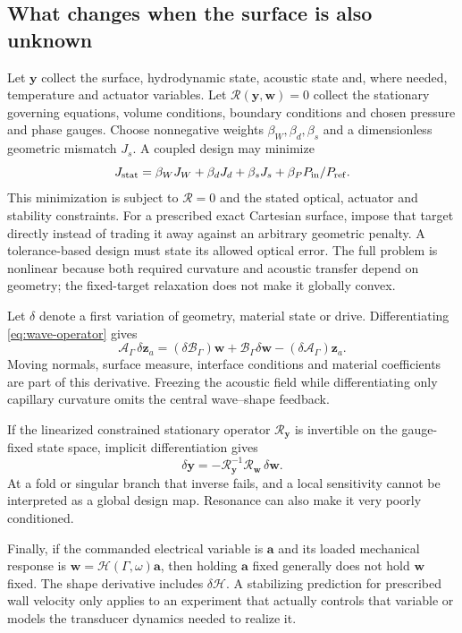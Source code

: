 \subsection{What changes when the surface is also unknown}
Let $\bm y$ collect the surface, hydrodynamic state, acoustic state and, where
needed, temperature and actuator variables. Let
$\mathcal R(\bm y,\bm w)=0$ collect the stationary governing equations,
volume conditions, boundary conditions and chosen pressure and phase gauges.
Choose nonnegative weights $\beta_W,\beta_d,\beta_s$ and a dimensionless
geometric mismatch $J_s$. A coupled design may minimize
\begin{equation}
 J_{\rm stat}=\beta_WJ_W+\beta_dJ_d+\beta_sJ_s
       +\beta_P P_{\rm in}/P_{\rm ref}.
 \label{eq:coupled-static-design}
\end{equation}
This minimization is subject to $\mathcal R=0$ and the stated optical,
actuator and stability constraints.
For a prescribed exact Cartesian surface, impose that target directly instead
of trading it away against an arbitrary geometric penalty. A tolerance-based
design must state its allowed optical error. The full problem is nonlinear
because both required curvature and acoustic transfer depend on geometry;
the fixed-target relaxation does not make it globally convex.

Let $\delta$ denote a first variation of geometry, material state or drive.
Differentiating \cref{eq:wave-operator} gives
\begin{equation}
 \mathcal A_\Gamma\,\delta\bm z_a
   =(\delta\mathcal B_\Gamma)\bm w
       +\mathcal B_\Gamma\delta\bm w
       -(\delta\mathcal A_\Gamma)\bm z_a.
 \label{eq:wave-sensitivity}
\end{equation}
Moving normals, surface measure, interface conditions and material coefficients
are part of this derivative. Freezing the acoustic field while differentiating
only capillary curvature omits the central wave--shape feedback.

If the linearized constrained stationary operator $\mathcal R_{\bm y}$ is
invertible on the gauge-fixed state space, implicit differentiation gives
\begin{equation}
 \delta\bm y=-\mathcal R_{\bm y}^{-1}
                         \mathcal R_{\bm w}\,\delta\bm w.
 \label{eq:implicit-sensitivity}
\end{equation}
At a fold or singular branch that inverse fails, and a local sensitivity cannot
be interpreted as a global design map. Resonance can also make it very poorly
conditioned.

Finally, if the commanded electrical variable is $\bm a$ and its loaded
mechanical response is $\bm w=\mathcal H(\Gamma,\omega)\bm a$, then holding
$\bm a$ fixed generally does not hold $\bm w$ fixed. The shape derivative
includes $\delta\mathcal H$. A stabilizing prediction for prescribed wall
velocity only applies to an experiment that actually controls that variable
or models the transducer dynamics needed to realize it.
